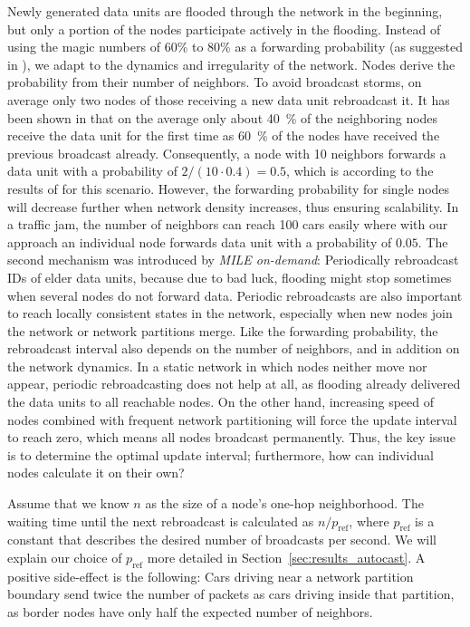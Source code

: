 \documentclass{acmrip}
\newcommand{\secref}[1]{Section~\ref{sec:#1}}
\begin{document}
Newly generated data units are flooded through the network in the
beginning, but only a portion of the nodes participate actively in
the flooding. Instead of using the magic numbers of 60\% to 80\% as
a forwarding probability (as suggested in \cite{867194}), we adapt
to the dynamics and irregularity of the network. Nodes derive the
probability from their number of neighbors. To avoid broadcast
storms, on average only two nodes of those receiving a new data unit
rebroadcast it. It has been shown in \cite{hellFisICWN02} that on
the average only about 40~\% of the neighboring nodes receive the
data unit for the first time as 60~\% of the nodes have received the
previous broadcast already. Consequently, a node with 10 neighbors
forwards a data unit with a probability of $2/(10\cdot0.4)=0.5$,
which is according to the results of \cite{867194} for this
scenario.
However, the forwarding probability for single nodes will decrease further when network density increases, thus ensuring scalability. In a traffic jam, the number of neighbors can reach 100 cars easily where with our approach an individual node forwards data unit with a probability of $0.05$.
The second mechanism was introduced by \textit{MILE on-demand}:
Periodically rebroadcast IDs of elder data units, because due to bad
luck, flooding might stop sometimes when several nodes do not
forward data. Periodic rebroadcasts are also important to reach
locally consistent states in the network, especially when new nodes
join the network or network partitions merge. Like the forwarding
probability, the rebroadcast interval also depends on the number of
neighbors, and in addition on the network dynamics. In a static
network in which nodes neither move nor appear, periodic
rebroadcasting does not help at all, as flooding already delivered
the data units to all reachable nodes. On the other hand, increasing
speed of nodes combined with frequent network partitioning will
force the update interval to reach zero, which means all nodes
broadcast permanently. Thus, the key issue is to determine the
optimal update interval; furthermore, how can individual nodes
calculate it on their own?

Assume that we know $n$ as the size of a node's one-hop
neighborhood. The waiting time until the next rebroadcast is
calculated as $n/p_{\mathrm{ref}}$, where $p_{\mathrm{ref}}$ is a
constant that describes the desired number of broadcasts per second.
We will explain our choice of $p_{\mathrm{ref}}$ more detailed in
\secref{results_autocast}. A positive side-effect is the following:
Cars driving near a network partition boundary send twice the number
of packets as cars driving inside that partition, as border nodes
have only half the expected number of neighbors.
\end{document}
